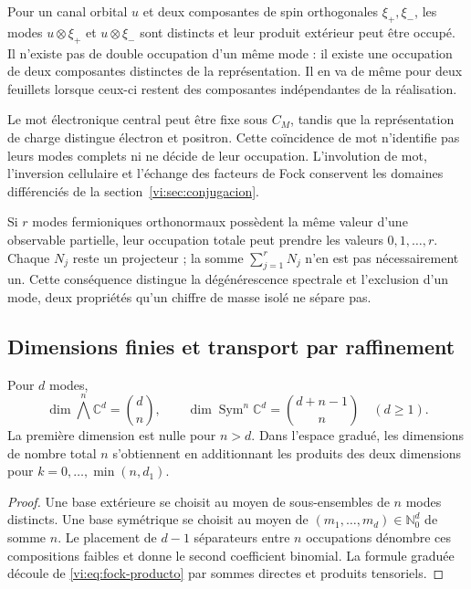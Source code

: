 Pour un canal orbital \(u\) et deux composantes de spin
orthogonales \(\xi_+,\xi_-\), les modes
\(u\otimes\xi_+\) et \(u\otimes\xi_-\) sont distincts et leur
produit extérieur peut être occupé. Il n’existe pas de double occupation
d’un même mode : il existe une occupation de deux composantes distinctes
de la représentation. Il en va de même pour deux feuillets lorsque ceux-ci
restent des composantes indépendantes de la réalisation.

Le mot électronique central peut être fixe sous \(C_M\), tandis que
la représentation de charge distingue électron et positron. Cette
coïncidence de mot n’identifie pas leurs modes complets ni
ne décide de leur occupation. L’involution de mot, l’inversion
cellulaire et l’échange des facteurs de Fock conservent les
domaines différenciés de la section~\ref{vi:sec:conjugacion}.

Si \(r\) modes fermioniques orthonormaux possèdent la même valeur
d’une observable partielle, leur occupation totale peut prendre les valeurs
\(0,1,\ldots,r\). Chaque \(N_j\) reste un projecteur ;
la somme \(\sum_{j=1}^rN_j\) n’en est pas nécessairement un. Cette
conséquence distingue la dégénérescence spectrale et l’exclusion d’un
mode, deux propriétés qu’un chiffre de masse isolé ne sépare pas.

\subsection{Dimensions finies et transport par raffinement}
\label{vi:subsec:fock-refinamiento}

\begin{proposition}
\label{vi:prop:censo-fock}
Pour \(d\) modes,
\[
 \dim\bigwedge^n\mathbb C^d=\binom dn,
 \qquad
 \dim\operatorname{Sym}^n\mathbb C^d=\binom{d+n-1}{n}
 \quad(d\ge1).
\]
La première dimension est nulle pour \(n>d\). Dans l’espace
gradué, les dimensions de nombre total \(n\) s’obtiennent
en additionnant les produits des deux dimensions pour
\(k=0,\ldots,\min(n,d_1)\).
\end{proposition}
\begin{proof}
Une base extérieure se choisit au moyen de sous-ensembles de \(n\) modes
distincts. Une base symétrique se choisit au moyen de
\((m_1,\ldots,m_d)\in\mathbb N_0^d\) de somme \(n\).
Le placement de \(d-1\) séparateurs entre \(n\) occupations
dénombre ces compositions faibles et donne le second coefficient binomial.
La formule graduée découle de \eqref{vi:eq:fock-producto} par
sommes directes et produits tensoriels.
\end{proof}

